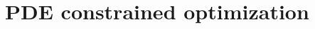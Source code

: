 \documentclass[10pt]{article}
\begin{document}
{



\section{PDE constrained optimization}

}
\end{document}
